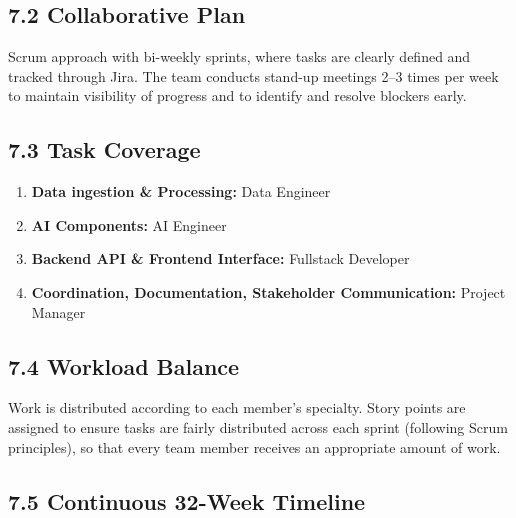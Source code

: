 \documentclass[12pt]{article}
\begin{document}
\subsection{7.2 Collaborative Plan}
Scrum approach with bi-weekly sprints, where tasks are clearly defined and tracked through Jira. The team conducts stand-up meetings 2--3 times per week to maintain visibility of progress and to identify and resolve blockers early.

\subsection{7.3 Task Coverage}
\begin{enumerate}
    \item \textbf{Data ingestion \& Processing:} Data Engineer
    \item \textbf{AI Components:} AI Engineer
    \item \textbf{Backend API \& Frontend Interface:} Fullstack Developer
    \item \textbf{Coordination, Documentation, Stakeholder Communication:} Project Manager
\end{enumerate}

\subsection{7.4 Workload Balance}
Work is distributed according to each member's specialty. Story points are assigned to ensure tasks are fairly distributed across each sprint (following Scrum principles), so that every team member receives an appropriate amount of work.

\subsection{7.5 Continuous 32-Week Timeline}
\end{document}
